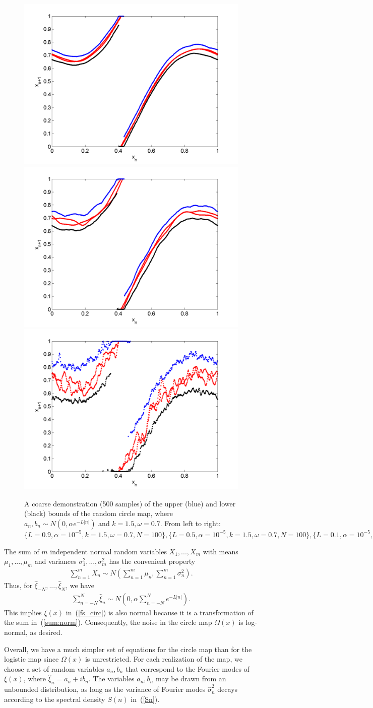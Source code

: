 \begin{figure}[htp]
\caption[Upper and lower bounds on the random circle map, Normal
distribution for $k=1.5,\omega=0.7$]{A coarse
  demonstration (500 samples) of the upper (blue) and lower (black)
  bounds of the random circle map, where $a_n,b_n\sim N(0,\alpha e^{-L|n|})$
  and $k=1.5,\omega=0.7$. From left to right:
  $\{L=0.9,\alpha = 10^{-5},k=1.5,\omega=0.7,N=100\}, \{L=0.5,\alpha = 10^{-5},k=1.5,\omega=0.7,N=100\},\{L=0.1,\alpha = 10^{-5},k=1.5,\omega=0.7,N=100\},$
  }\label{fig:circ_n_envelope3}
\centering
\includegraphics[width=.3\textwidth]{figs/envelope_norm_500_k15_L09_w07.png}\hfill
\includegraphics[width=.3\textwidth]{figs/envelope_norm_500_k15_L05_w07.png}\hfill
\includegraphics[width=.3\textwidth]{figs/envelope_norm_500_k15_L01_w07.png}
\end{figure}

The sum of $m$ independent normal random variables
$X_1, ..., X_m$ with means $\mu_1, ..., \mu_m$ and variances
$\sigma_1^2, ..., \sigma_m^2$ has the convenient property
\begin{align*}
\sum_{n=1}^mX_n \sim N\left(\sum_{n=1}^m\mu_n, \sum_{n=1}^m\sigma_n^2\right).
\end{align*}
Thus, for $\hat{\xi}_{-N},...,\hat{\xi}_N$, we have
\begin{align}\label{sum:norm}
\sum_{n=-N}^N \hat{\xi}_n \sim N\left(0, \alpha\sum_{n=-N}^N e^{-L|n|}\right).
\end{align}
This implies $\xi(x)$ in~(\ref{fs_circ}) is also normal because it is
a transformation of the sum in~(\ref{sum:norm}). Consequently, the
noise in the circle map $\Omega(x)$ is log-normal, as
desired. 

Overall, we have a much simpler set of equations for the circle map
than for the logistic map since $\Omega(x)$ is unrestricted. For each
realization of the map, we choose a set of random variables $a_n, b_n$
that correspond to the Fourier modes of $\xi(x)$, where $\hat{\xi}_n =
a_n + ib_n$. The variables $a_n, b_n$ may be drawn from an unbounded
distribution, as long as the variance of Fourier modes $\hat{\sigma}_n^2$ decays according to
the spectral density $S(n)$ in~(\ref{Sn}). 